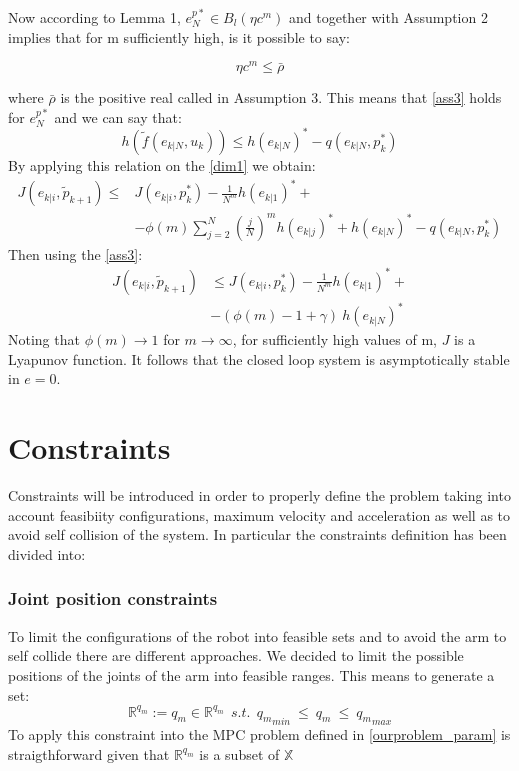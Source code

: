Now according to Lemma 1, $e_N^{p*} \in B_l(\eta c^m)$ and together with Assumption 2 implies that for m sufficiently high, is it possible to say:

\begin{equation}
\eta c^m \leq \bar{\rho}
\end{equation}

where $\bar{\rho}$ is the positive real called in Assumption 3.
This means that \ref{ass3} holds for $e_N^{p*}$ and we can say that:
\begin{equation*}
    h(\tilde{f}(e_{k|N},u_k)) \le h(e_{k|N})^*-q(e_{k|N},p_k^*)
\end{equation*}
By applying this relation on the \ref{dim1} we obtain: 
\begin{equation*}
    \begin{split}
        J({e}_{k|i},\tilde{p}_{k+1})\le &J({e}_{k|i},p_{k}^*) - \frac{1}{N^m}h(e_{k|1})^*+ \\ 
        &-\phi(m)\sum_{j=2}^{N}\left(\frac{j}{N}\right)^m h(e_{k|j})^*+ h(e_{k|N})^*-q(e_{k|N},p_k^*)
    \end{split}
\end{equation*}
Then using the \ref{ass3}:
\begin{equation*}
    \begin{split}
        J({e}_{k|i},\tilde{p}_{k+1})&\le J({e}_{k|i},p_{k}^*) - \frac{1}{N^m}h(e_{k|1})^*+ \\ 
            &-(\phi(m)-1+\gamma)\ h(e_{k|N})^*
    \end{split}
\end{equation*}
Noting that $\phi(m) \rightarrow 1$ for $m \rightarrow \infty$, for sufficiently high values of m, $J$ is a Lyapunov function. It follows that the closed loop system is asymptotically stable in $e=0$.



\section{Constraints}

Constraints will be introduced in order to properly define the problem taking into account feasibiity configurations, maximum velocity and acceleration as well as to avoid self collision of the system. In particular the constraints definition has been divided into: 

\subsubsection*{Joint position constraints}
	To limit the configurations of the robot into feasible sets and to avoid the arm to self collide there are different approaches. We decided to limit the possible positions of the joints of the arm into feasible ranges. This means to generate a set:
	\begin{equation}
		\mathbb{R}^{q_m}:=q_m \in \mathbb{R}^{q_m}\ \ s.t.\ \  {q_m}_{min}\ \leq\ q_m\ \leq\ {q_m}_{max} 
	\end{equation}
	To apply this constraint into the MPC problem defined in \ref{ourproblem_param} is straigthforward given that $\mathbb{R}^{q_m}$ is a subset of $\mathbb{X}$
